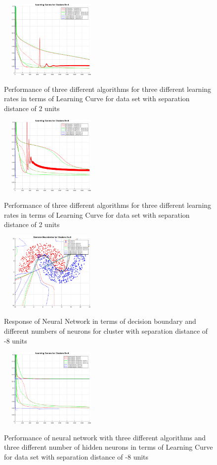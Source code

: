 \documentclass[conference]{IEEEtran}
\begin{document}
\begin{figure}[h!]
\centering
{\includegraphics[width=2in,height=1.5in,clip,keepaspectratio]{Exp1_LCn4.eps} }\\
\caption{Performance of three different algorithms for three different learning rates in terms of Learning Curve for data set with separation distance of 2 units}
\end{figure}
\begin{figure}[h!]
\centering
{\includegraphics[width=2in,height=1.5in,clip,keepaspectratio]{Exp1_LCn8.eps} }\\
\caption{Performance of three different algorithms for three different learning rates in terms of Learning Curve for data set with separation distance of 2 units}
\end{figure}
\begin{figure}[h!]
\centering
{\includegraphics[width=2in,height=1.5in,clip,keepaspectratio]{Exp2_DBn8.eps} }\\
\caption{Response of Neural Network in terms of decision boundary  and different numbers of neurons for cluster with separation distance of -8 units}
\end{figure}
\begin{figure}[h!]
\centering
{\includegraphics[width=2in,height=1.5in,clip,keepaspectratio]{Exp2_LCn8.eps} }\\
\begin{center}
\caption{Performance of neural network with three different algorithms and three different number of hidden neurons in terms of Learning Curve for data set with separation distance of -8 units }
\end{center}
\end{figure}
\end{document}
